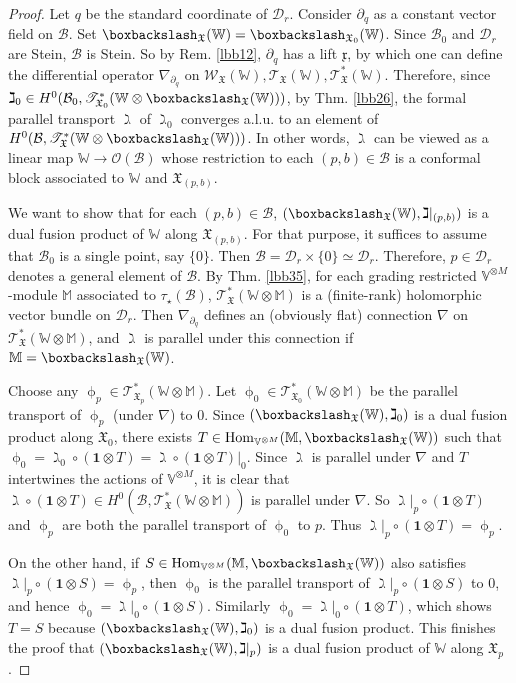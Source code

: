 \documentclass[11pt,b5paper,notitlepage]{article}
\theoremstyle{definition}
\theoremstyle{plain}
\newcommand{\mc}{\mathcal}
\newcommand{\idt}{\mathbf{1}}
\newcommand{\Hom}{\mathrm{Hom}}
\newcommand{\scr}{\mathscr}
\newcommand{\xk}{\mathfrak x}
\newcommand{\Vbb}{\mathbb V}
\newcommand{\Wbb}{\mathbb W}
\newcommand{\Mbb}{\mathbb M}
\newcommand{\<}{\left\langle}
\renewcommand{\>}{\right\rangle}
\newcommand{\MB}{\mathcal{B}}
\newcommand{\fx}{\mathfrak{X}}
\newcommand{\MD}{\mathcal{D}}
\newcommand{\bbs}{\boxbackslash}
\numberwithin{equation}{section}
\begin{document}
\begin{proof}
Let $q$ be the standard coordinate of $\MD_r$. Consider $\partial_q$ as a constant vector field on $\MB$. Set $\bbs_\fx(\Wbb)=\bbs_{\fx_0}(\Wbb)$. Since $\MB_0$ and $\MD_r$ are Stein, $\MB$ is Stein. So by Rem. \ref{lbb12}, $\partial_q$ has a lift $\xk$, by which one can define the differential operator $\nabla_{\partial_q}$ on $\scr W_\fx(\Wbb),\scr T_\fx(\Wbb),\scr T_\fx^*(\Wbb)$. Therefore, since $\gimel_0\in H^0(\MB_0,\scr T_{\fx_0}^*(\Wbb\otimes\bbs_\fx(\Wbb)))$, by Thm. \ref{lbb26}, the formal parallel transport $\gimel$ of $\gimel_0$ converges a.l.u. to an element of $H^0(\MB,\scr T_\fx^*(\Wbb\otimes\bbs_\fx(\Wbb)))$. In other words, $\gimel$ can be viewed as a linear map $\Wbb\rightarrow\mc O(\MB)$ whose restriction to each $(p,b)\in\MB$ is a conformal block associated to $\Wbb$ and $\fx_{(p,b)}$.

We want to show that for each $(p,b)\in\MB$, $(\bbs_\fx(\Wbb),\gimel|_{(p,b)})$ is a dual fusion product of $\Wbb$ along $\fx_{(p,b)}$. For that purpose, it suffices to assume that $\MB_0$ is a single point, say $\{0\}$. Then $\MB=\MD_r\times\{0\}\simeq\MD_r$. Therefore, $p\in\MD_r$ denotes a general element of $\MB$. By Thm. \ref{lbb35}, for each grading restricted $\Vbb^{\otimes M}$-module $\Mbb$ associated to $\tau_\star(\MB)$, $\scr T_\fx^*(\Wbb\otimes\Mbb)$ is a (finite-rank) holomorphic vector bundle on $\MD_r$. Then $\nabla_{\partial_q}$ defines an (obviously flat) connection $\nabla$ on $\scr T_\fx^*(\Wbb\otimes\Mbb)$, and $\gimel$ is parallel under this connection if $\Mbb=\bbs_\fx(\Wbb)$. 

Choose any $\upphi_p\in\scr T_{\fx_p}^*(\Wbb\otimes\Mbb)$. Let $\upphi_0\in\scr T_{\fx_0}^*(\Wbb\otimes \Mbb)$ be the parallel transport of $\upphi_p$ (under $\nabla$) to $0$. Since $(\bbs_\fx(\Wbb),\gimel_0)$ is a dual fusion product along $\fx_0$, there exists $T\in\Hom_{\Vbb^{\otimes M}}(\Mbb,\bbs_\fx(\Wbb))$ such that $\upphi_0=\gimel_0\circ(\idt\otimes T)=\gimel\circ(\idt\otimes T)|_0$. Since $\gimel$ is parallel under $\nabla$ and $T$ intertwines the actions of $\Vbb^{\otimes M}$, it is clear that $\gimel\circ(\idt\otimes T)\in H^0(\MB,\scr T_\fx^*(\Wbb\otimes \Mbb))$ is parallel under $\nabla$. So $\gimel|_p\circ(\idt\otimes T)$ and $\upphi_p$ are both the parallel transport of $\upphi_0$ to $p$. Thus $\gimel|_p\circ(\idt\otimes T)=\upphi_p$.

On the other hand, if $S\in\Hom_{\Vbb^{\otimes M}}(\Mbb,\bbs_\fx(\Wbb))$ also satisfies $\gimel|_p\circ(\idt\otimes S)=\upphi_p$, then $\upphi_0$ is the parallel transport of $\gimel|_p\circ(\idt\otimes S)$ to $0$, and hence $\upphi_0=\gimel|_0\circ(\idt\otimes S)$. Similarly $\upphi_0=\gimel|_0\circ(\idt\otimes T)$, which shows $T=S$ because $(\bbs_\fx(\Wbb),\gimel_0)$ is a dual fusion product. This finishes the proof that $(\bbs_\fx(\Wbb),\gimel|_p)$ is a dual fusion product of $\Wbb$ along $\fx_p$.
\end{proof}
\end{document}
